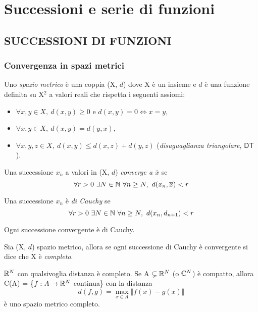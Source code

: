 \documentclass[Completo.tex]{subfiles}
\begin{document}
\chapter{Successioni e serie di funzioni}
\section{SUCCESSIONI DI FUNZIONI}
\subsection{Convergenza in spazi metrici}
\begin{Def}
	Uno \textit{spazio metrico} è una coppia (X, $d$) dove X è un insieme e $d$ è una funzione definita su X$^2$ a valori reali che rispetta i seguenti assiomi:
	\begin{itemize}
		\item $\forall x, y \in X, \ d(x,y) \geq 0$ e $d(x,y) = 0 \iff x = y$,
		\item $\forall x,y \in X, \ d(x,y) = d(y,x)$,
		\item $\forall x, y, z \in X, \ d(x,y) \leq d(x,z) + d(y,z)$ (\textit{disuguaglianza triangolare}, $\mathsf{DT}$).
	\end{itemize}
\end{Def}
\begin{Def} 
	Una successione $x_n$ a valori in (X, $d$) \textit{converge a $\overline{x}$} se
	\begin{equation*}
	\forall r > 0 \ \exists N \in \bb[N] \ \forall n \geq N, \ d(x_n, \overline{x}) < r
	\end{equation*}
\end{Def}
\begin{Def}
	Una successione $x_n$ è \textit{di Cauchy} se 
	\begin{equation*}
	\forall r > 0 \ \exists N \in \bb[N] \ \forall n \geq N, \ d(x_n, d_{n+1}) < r
	\end{equation*}
\end{Def}
\begin{Th}
	Ogni successione convergente è di Cauchy.
\end{Th}
\begin{Def}
	Sia (X, $d$) spazio metrico, allora se ogni successione di Cauchy è convergente si dice che X è \textit{completo}.
\end{Def}
\begin{Ex}
	$\bb[R]^{N}$ con qualsivoglia distanza è completo. Se A $\sneq \bb[R]^{N}$ (o $\bb[C]^{N}$) è compatto, allora C(A) = \{$f: A \ra \bb[R]^{N}$ continua\} con la distanza 
	\begin{equation*}
	d(f,g) = \max\limits_{x \in A} \Vert f(x)-g(x) \Vert
	\end{equation*}
	è uno spazio metrico completo.
\end{Ex}
\end{document}
